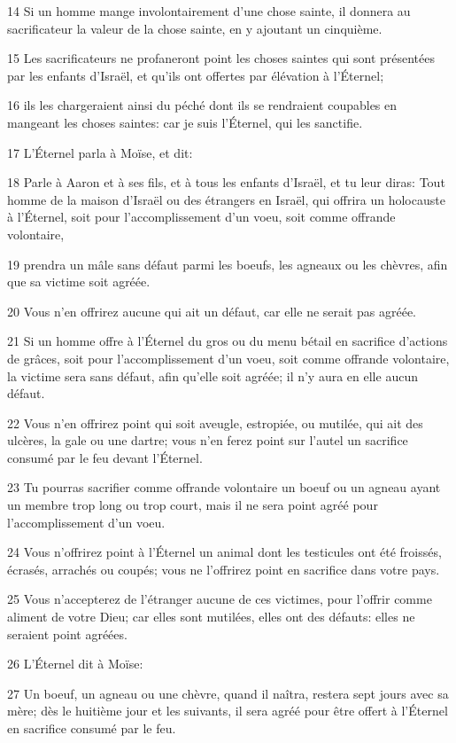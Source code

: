 \par 14 Si un homme mange involontairement d'une chose sainte, il donnera au sacrificateur la valeur de la chose sainte, en y ajoutant un cinquième.
\par 15 Les sacrificateurs ne profaneront point les choses saintes qui sont présentées par les enfants d'Israël, et qu'ils ont offertes par élévation à l'Éternel;
\par 16 ils les chargeraient ainsi du péché dont ils se rendraient coupables en mangeant les choses saintes: car je suis l'Éternel, qui les sanctifie.
\par 17 L'Éternel parla à Moïse, et dit:
\par 18 Parle à Aaron et à ses fils, et à tous les enfants d'Israël, et tu leur diras: Tout homme de la maison d'Israël ou des étrangers en Israël, qui offrira un holocauste à l'Éternel, soit pour l'accomplissement d'un voeu, soit comme offrande volontaire,
\par 19 prendra un mâle sans défaut parmi les boeufs, les agneaux ou les chèvres, afin que sa victime soit agréée.
\par 20 Vous n'en offrirez aucune qui ait un défaut, car elle ne serait pas agréée.
\par 21 Si un homme offre à l'Éternel du gros ou du menu bétail en sacrifice d'actions de grâces, soit pour l'accomplissement d'un voeu, soit comme offrande volontaire, la victime sera sans défaut, afin qu'elle soit agréée; il n'y aura en elle aucun défaut.
\par 22 Vous n'en offrirez point qui soit aveugle, estropiée, ou mutilée, qui ait des ulcères, la gale ou une dartre; vous n'en ferez point sur l'autel un sacrifice consumé par le feu devant l'Éternel.
\par 23 Tu pourras sacrifier comme offrande volontaire un boeuf ou un agneau ayant un membre trop long ou trop court, mais il ne sera point agréé pour l'accomplissement d'un voeu.
\par 24 Vous n'offrirez point à l'Éternel un animal dont les testicules ont été froissés, écrasés, arrachés ou coupés; vous ne l'offrirez point en sacrifice dans votre pays.
\par 25 Vous n'accepterez de l'étranger aucune de ces victimes, pour l'offrir comme aliment de votre Dieu; car elles sont mutilées, elles ont des défauts: elles ne seraient point agréées.
\par 26 L'Éternel dit à Moïse:
\par 27 Un boeuf, un agneau ou une chèvre, quand il naîtra, restera sept jours avec sa mère; dès le huitième jour et les suivants, il sera agréé pour être offert à l'Éternel en sacrifice consumé par le feu.
